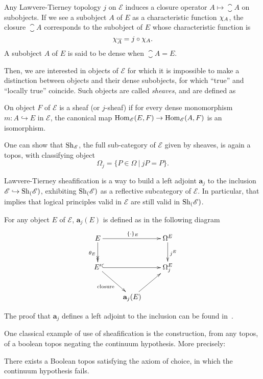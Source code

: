 Any Lawvere-Tierney topology $j$ on $\mathcal E$ induces a closure operator
$A \mapsto \closure{A}$ on subobjects. If we see a subobject $A$ of $E$
as a characteristic function $\chi_{A}$, the closure $\closure{A}$
corresponds to the subobject of $E$ whose characteristic function is 
%
\[
\chi_{\overline{A}} = j \circ \chi_{A}.
\]%
%
A subobject $A$ of $E$ is said to
be dense when $\closure{A} = E$.

Then, we are interested in objects of $\mathcal E$ for which it is
impossible to make a distinction between objects and their dense
subobjects, \ie{} for which ``true'' and ``locally true''
coincide. Such objects are called {\em sheaves}, and are defined as

\begin{defi}
  On object $F$ of $\mathcal E$ is a sheaf (or $j$-sheaf) if for every
  dense monomorphism $m: A \hookrightarrow E$ in $\mathcal E$, the
  canonical map $\mathrm{Hom}_{\mathcal E}(E,F) \rightarrow \mathrm{Hom}_{\mathcal E}(A,F)$ is an
isomorphism.
\end{defi}

One can show that $\mathrm{Sh}_{\mathcal E}$, the full sub-category of
$\mathcal E$ given by
sheaves, is again a topos, with classifying object
%
\[
\Omega_j = \{ P \in \Omega \ | \ j P  = P \}.
\]

Lawvere-Tierney sheafification is a way to build a left adjoint $\mathbf{a}_j$ to the
inclusion $\mathcal E \hookrightarrow \mathrm{Sh}_{(}\mathcal E)$, exhibiting
$\mathrm{Sh}_{(}\mathcal E)$ as a reflective subcategory of $\mathcal E$. In
particular, that implies that logical principles valid in $\mathcal E$
are still valid in $\mathrm{Sh}_{(}\mathcal E)$.

For any object $E$ of $\mathcal E$, $\mathbf{a}_j(E)$ is defined as in
the following diagram
\[
  \xymatrix{ 
    E \ar[rr]^{\{\cdot\}_E} \ar@{->>}[d]_{\theta_E} && \Omega^E \ar[d]^{j^E}\\
    E' \ar@{^{(}->}[rr] \ar[dr]_{\text{closure}} && \Omega_j^E \\
    & \mathbf{a}_j(E) \ar[ur]&
  }
\]

The proof that $\mathbf a_j$ defines a left adjoint to the inclusion
can be found in~\cite{maclanemoerdijk}.

One classical example of use of sheafification is the construction,
from any topos, of a boolean topos negating the continuum
hypothesis. More precisely:

\begin{thm}
  There exists a Boolean topos satisfying the axiom of choice, in
  which the continuum hypothesis fails.
\end{thm}

